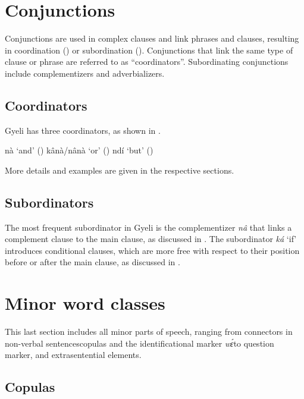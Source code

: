 \section{Conjunctions}
\label{sec:CONJ}

Conjunctions are used in complex clauses
and link phrases and clauses, resulting in coordination () or subordination (). Conjunctions that link the same type of clause or phrase are referred to as ``coordinators''. Subordinating conjunctions include complementizers and adverbializers.

\subsection{Coordinators}
\label{sec:COORD}

Gyeli has three coordinators, as shown in .

\ea \label{Coordi}
  \ea \label{Coordia} nà `and' ()
\ex\label{Coordib} kânà/nânà `or' ()
\ex\label{Coordic} ndí `but' ()
\z
\z

\noindent More details and examples are given in the respective sections.




\subsection{Subordinators}
\label{sec:COMP}

The most frequent subordinator in Gyeli is the complementizer {\itshape nâ} that links a complement clause to the main clause, as discussed in . The subordinator {\itshape ká} `if' introduces conditional clauses, which are more free with respect to their position before or after the main clause, as discussed in .


\section{Minor word classes}
\label{sec:Others}

This last section includes all minor parts of speech, ranging from connectors in non-verbal sentences{\textemdash}copulas and the identificational marker {\itshape wɛ́}{\textemdash}to question marker, and extrasentential elements.

\subsection{Copulas}
\label{sec:Copulas}

